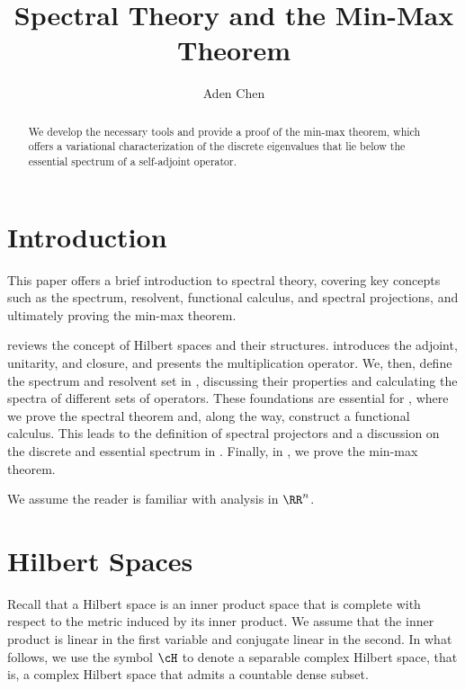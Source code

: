 \documentclass[oneside,reqno,letterpaper]{amsart}
\title[Spectral Theory and the Min-Max Theorem]{Spectral Theory and the Min-Max Theorem}
\author{Aden Chen}
\begin{document}
\begin{abstract}
  We develop the necessary tools and provide a proof of the min-max theorem, which offers a variational characterization of the discrete eigenvalues that lie below the essential spectrum of a self-adjoint operator. 
\end{abstract}

\maketitle

\tableofcontents




\section*{Introduction}
This paper offers a brief introduction to spectral theory, covering key concepts such as the spectrum, resolvent, functional calculus, and spectral projections, and ultimately proving the min-max theorem. 

 reviews the concept of Hilbert spaces and their structures. 
 introduces the adjoint, unitarity, and closure, and presents the multiplication operator. 
We, then, define the spectrum and resolvent set in , discussing their properties and calculating the spectra of different sets of operators. 
These foundations are essential for , where we prove the spectral theorem and, along the way, construct a functional calculus.
This leads to the definition of spectral projectors and a discussion on the discrete and essential spectrum in . 
Finally, in , we prove the min-max theorem. 

We assume the reader is familiar with analysis in \(\RR^n\). 






  
\section{Hilbert Spaces}
\label{sec:hilbert}


Recall that a Hilbert space is an inner product space that is complete with respect to the metric induced by its inner product.
We assume that the inner product is linear in the first variable and conjugate linear in the second. 
In what follows, we use the symbol \(\cH\) to denote a separable complex Hilbert space, 
that is, a complex Hilbert space that admits a countable dense subset.
\end{document}

